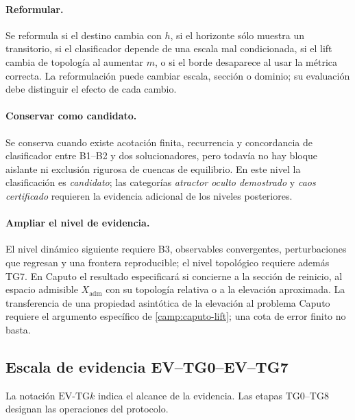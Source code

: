\paragraph{Reformular.}
Se reformula si el destino cambia con \(h\), si el horizonte sólo muestra un
transitorio, si el clasificador depende de una escala mal condicionada, si el
lift cambia de topología al aumentar \(m\), o si el borde desaparece al usar
la métrica correcta. La reformulación puede cambiar escala, sección o dominio; su evaluación debe
distinguir el efecto de cada cambio.

\paragraph{Conservar como candidato.}
Se conserva cuando existe acotación finita, recurrencia y concordancia de
clasificador entre B1--B2 y dos solucionadores, pero todavía no hay bloque
aislante ni exclusión rigurosa de cuencas de equilibrio. En este nivel la
clasificación es \emph{candidato}; las categorías \emph{atractor oculto
demostrado} y \emph{caos certificado} requieren la evidencia adicional de los
niveles posteriores.

\paragraph{Ampliar el nivel de evidencia.}
El nivel dinámico siguiente requiere B3, observables convergentes,
perturbaciones que regresan y una frontera reproducible; el nivel topológico
requiere además TG7. En Caputo el resultado especificará si concierne a la
sección de reinicio, al espacio admisible \(X_{\mathrm{adm}}\) con su topología
relativa o a la elevación aproximada. La transferencia de una propiedad
asintótica de la elevación al problema Caputo requiere el argumento específico
de \cref{camp:caputo-lift}; una cota de error finito no basta.

\subsection{Escala de evidencia EV--TG0--EV--TG7}
\label{camp:evidence-levels}

La notación \(\mathrm{EV}\text{-}\mathrm{TG}k\) indica el alcance de la
evidencia. Las etapas TG0--TG8 designan las operaciones del protocolo.

